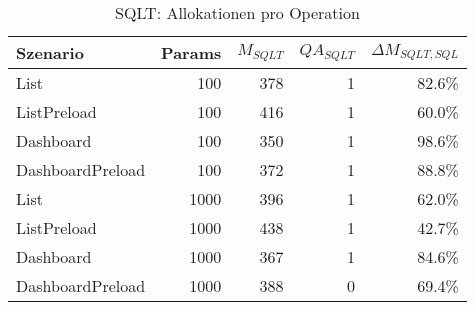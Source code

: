 
\begin{table}[ht]
\centering
\caption{SQLT: Allokationen pro Operation}
\begin{tabular}{lrrrr}
\toprule
Szenario & Params & ${M_{SQLT}}$ & ${QA_{SQLT}}$ & ${\Delta M_{SQLT,SQL}}$ \\
\midrule

	List & 100 & 378 & 1 & 82.6\% \\
	ListPreload & 100 & 416 & 1 & 60.0\% \\
	Dashboard & 100 & 350 & 1 & 98.6\% \\
	DashboardPreload & 100 & 372 & 1 & 88.8\% \\
	List & 1000 & 396 & 1 & 62.0\% \\
	ListPreload & 1000 & 438 & 1 & 42.7\% \\
	Dashboard & 1000 & 367 & 1 & 84.6\% \\
	DashboardPreload & 1000 & 388 & 0 & 69.4\% \\
\bottomrule
\end{tabular}
\label{tab:benchmark_sqlt_allocsperop}
\end{table}
	